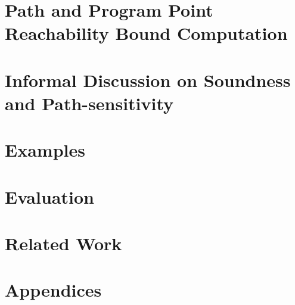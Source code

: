 \documentclass[a4paper,11pt]{article}
\begin{document}
\section{Path and Program Point Reachability Bound Computation}
\label{sec:alg-rb}



\section{Informal Discussion on Soundness and Path-sensitivity}
\label{sec:thminformal}


\section{Examples}
\label{sec:example}

\section{Evaluation}
\section{Related Work}
%
\clearpage
\appendix
{}
\section*{Appendices}


\clearpage


\end{document}
